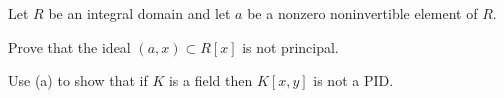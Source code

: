 Let $R$ be an integral domain and let $a$ be a nonzero noninvertible
element of $R$.
\begin{alist}
\item Prove that the ideal $(a,x)\subset R[x]$ is not principal.
\item Use (a) to show that if $K$ is a field then $K[x,y]$ is not a
  PID.
\end{alist}
